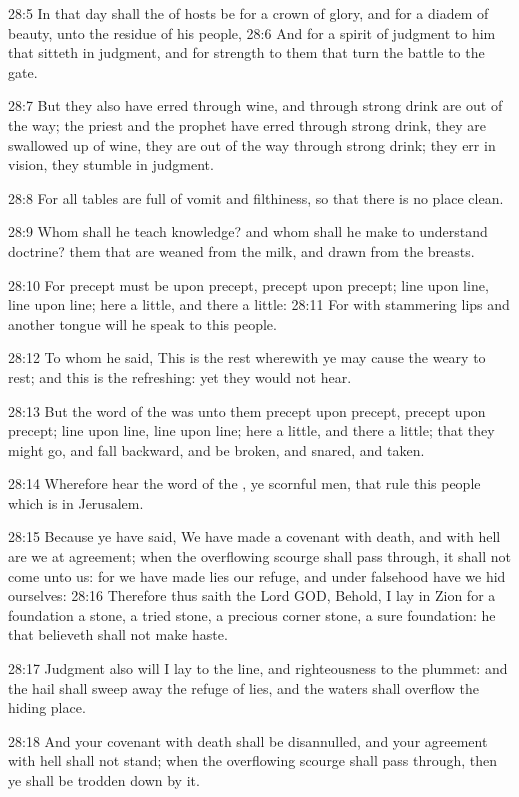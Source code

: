 28:5 In that day shall the \LORD of hosts be for a crown of glory, and
for a diadem of beauty, unto the residue of his people, 28:6 And for a
spirit of judgment to him that sitteth in judgment, and for strength
to them that turn the battle to the gate.

28:7 But they also have erred through wine, and through strong drink
are out of the way; the priest and the prophet have erred through
strong drink, they are swallowed up of wine, they are out of the way
through strong drink; they err in vision, they stumble in judgment.

28:8 For all tables are full of vomit and filthiness, so that there is
no place clean.

28:9 Whom shall he teach knowledge? and whom shall he make to
understand doctrine? them that are weaned from the milk, and drawn
from the breasts.

28:10 For precept must be upon precept, precept upon precept; line
upon line, line upon line; here a little, and there a little: 28:11
For with stammering lips and another tongue will he speak to this
people.

28:12 To whom he said, This is the rest wherewith ye may cause the
weary to rest; and this is the refreshing: yet they would not hear.

28:13 But the word of the \LORD was unto them precept upon precept,
precept upon precept; line upon line, line upon line; here a little,
and there a little; that they might go, and fall backward, and be
broken, and snared, and taken.

28:14 Wherefore hear the word of the \LORD, ye scornful men, that rule
this people which is in Jerusalem.

28:15 Because ye have said, We have made a covenant with death, and
with hell are we at agreement; when the overflowing scourge shall pass
through, it shall not come unto us: for we have made lies our refuge,
and under falsehood have we hid ourselves: 28:16 Therefore thus saith
the Lord GOD, Behold, I lay in Zion for a foundation a stone, a tried
stone, a precious corner stone, a sure foundation: he that believeth
shall not make haste.

28:17 Judgment also will I lay to the line, and righteousness to the
plummet: and the hail shall sweep away the refuge of lies, and the
waters shall overflow the hiding place.

28:18 And your covenant with death shall be disannulled, and your
agreement with hell shall not stand; when the overflowing scourge
shall pass through, then ye shall be trodden down by it.

